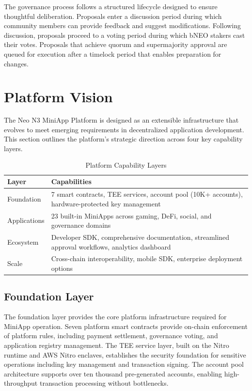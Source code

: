 \documentclass[11pt,a4paper]{article}
\begin{document}
The governance process follows a structured lifecycle designed to ensure thoughtful deliberation. Proposals enter a discussion period during which community members can provide feedback and suggest modifications. Following discussion, proposals proceed to a voting period during which bNEO stakers cast their votes. Proposals that achieve quorum and supermajority approval are queued for execution after a timelock period that enables preparation for changes.

\newpage
\section{Platform Vision}

The Neo N3 MiniApp Platform is designed as an extensible infrastructure that evolves to meet emerging requirements in decentralized application development. This section outlines the platform's strategic direction across four key capability layers.

\begin{table}[h]
\centering
\caption{Platform Capability Layers}
\begin{tabular}{@{}lp{8cm}@{}}
\toprule
\textbf{Layer} & \textbf{Capabilities} \\
\midrule
Foundation & 7 smart contracts, TEE services, account pool (10K+ accounts), hardware-protected key management \\
Applications & 23 built-in MiniApps across gaming, DeFi, social, and governance domains \\
Ecosystem & Developer SDK, comprehensive documentation, streamlined approval workflows, analytics dashboard \\
Scale & Cross-chain interoperability, mobile SDK, enterprise deployment options \\
\bottomrule
\end{tabular}
\label{tab:capabilities}
\end{table}

\subsection{Foundation Layer}

The foundation layer provides the core platform infrastructure required for MiniApp operation. Seven platform smart contracts provide on-chain enforcement of platform rules, including payment settlement, governance voting, and application registry management. The TEE service layer, built on the Nitro runtime and AWS Nitro enclaves, establishes the security foundation for sensitive operations including key management and transaction signing. The account pool architecture supports over ten thousand pre-generated accounts, enabling high-throughput transaction processing without bottlenecks.
\end{document}
